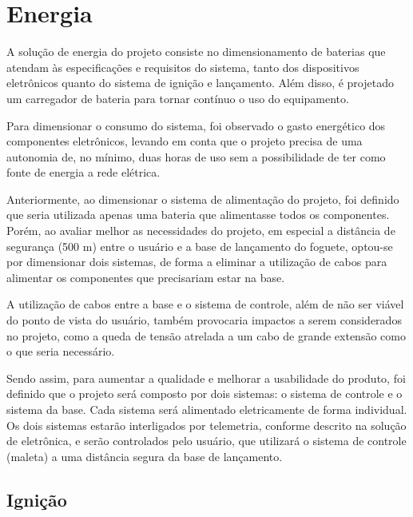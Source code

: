\chapter{Energia}

\par A solução de energia do projeto consiste no dimensionamento de baterias que atendam às especificações e requisitos do sistema, tanto dos dispositivos eletrônicos quanto do sistema de ignição e lançamento. Além disso, é projetado um carregador de bateria para tornar contínuo o uso do equipamento.

\par Para dimensionar o consumo do sistema, foi observado o gasto energético dos componentes eletrônicos, levando em conta que o projeto precisa de uma autonomia de, no mínimo, duas horas de uso sem a possibilidade de ter como fonte de energia a rede elétrica.

\par Anteriormente, ao dimensionar o sistema de alimentação do projeto, foi definido que seria utilizada apenas uma bateria que alimentasse todos os componentes. Porém, ao avaliar melhor as necessidades do projeto, em especial a distância de segurança (500 m) entre o usuário e a base de lançamento do foguete, optou-se por dimensionar dois sistemas, de forma a eliminar a utilização de cabos para alimentar os componentes que precisariam estar na base.

\par A utilização de cabos entre a base e o sistema de controle, além de não ser viável do ponto de vista do usuário, também provocaria impactos a serem considerados no projeto, como a queda de tensão atrelada a um cabo de grande extensão como o que seria necessário.

\par Sendo assim, para aumentar a qualidade e melhorar a usabilidade do produto, foi definido que o projeto será composto por dois sistemas: o sistema de controle e o sistema da base. Cada sistema será alimentado eletricamente de forma individual. Os dois sistemas estarão interligados por telemetria, conforme descrito na solução de eletrônica, e serão controlados pelo usuário, que utilizará o sistema de controle (maleta) a uma distância segura da base de lançamento.

\section{Ignição}
\label{sec:ignição}

